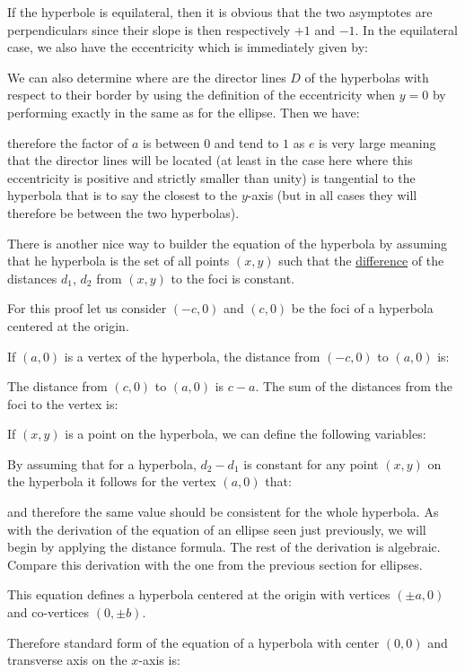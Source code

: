 	If the hyperbole is equilateral, then it is obvious that the two asymptotes are perpendiculars since their slope is then respectively $+1$ and $-1$. In the equilateral case, we also have the eccentricity which is immediately given by:
	
	We can also determine where are the director lines $D$ of the hyperbolas with respect to their border by using the definition of the eccentricity when $y=0$ by performing exactly in the same as for the ellipse. Then we have:
	
	therefore the factor of $a$ is between $0$ and tend to $1$ as $e$ is very large meaning that the director lines will be located (at least in the case here where this eccentricity is positive and strictly smaller than unity) is tangential to the hyperbola that is to say the closest to the $y$-axis (but in all cases they will therefore be between the two hyperbolas).
	
	There is another nice way to builder the equation of the hyperbola by assuming that he hyperbola is the set of all points $(x,y)$ such that the \underline{difference} of the distances $d_1$, $d_2$ from $(x,y)$ to the foci is constant.

	For this proof let us consider $(-c,0)$ and $(c,0)$ be the foci of a hyperbola centered at the origin.

	If $(a,0)$ is a vertex of the hyperbola, the distance from $(-c,0)$ to $(a,0)$ is:
	
	The distance from $(c,0)$ to $(a,0)$ is $c-a$. The sum of the distances from the foci to the vertex is:
	
	If $(x,y)$ is a point on the hyperbola, we can define the following variables:
	
	By assuming that for a hyperbola, $d_2-d_1$ is constant for any point $(x,y)$ on the hyperbola it follows for the vertex $(a,0)$ that:
	
	and therefore the same value should be consistent for the whole hyperbola.  As with the derivation of the equation of an ellipse seen just previously, we will begin by applying the distance formula. The rest of the derivation is algebraic. Compare this derivation with the one from the previous section for ellipses.
	
	This equation defines a hyperbola centered at the origin with vertices $(\pm a,0)$ and co-vertices $(0,\pm b)$.
	
	Therefore standard form of the equation of a hyperbola with center $(0,0)$ and transverse axis on the $x$-axis is:
	
